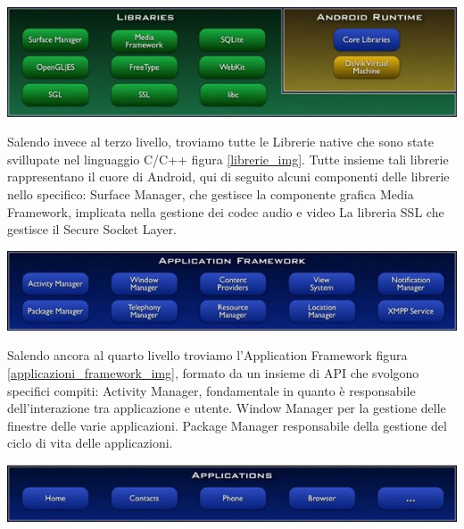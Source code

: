 \begin{center}
\includegraphics[width=1\textwidth]{imgs/Librerie.jpg}
\label{librerie_img}%
\end{center}

Salendo invece al terzo livello, troviamo tutte le Librerie native che sono state svillupate nel linguaggio C/C++ figura \ref{librerie_img}.
Tutte insieme tali librerie rappresentano il cuore di Android, qui di seguito alcuni componenti delle librerie nello specifico: Surface Manager, che gestisce la componente grafica
Media Framework, implicata nella gestione dei codec audio e video
La libreria SSL che gestisce il Secure Socket Layer.

\begin{center}
\includegraphics[width=1\textwidth]{imgs/Applicazioni_Framework.jpg}
\label{applicazioni_framework_img}%
\end{center}

Salendo ancora al quarto livello troviamo l'Application Framework figura \ref{applicazioni_framework_img}, formato da un insieme di API che svolgono specifici compiti:
Activity Manager, fondamentale in quanto è responsabile dell'interazione tra applicazione e utente.
Window Manager per la gestione delle finestre delle varie applicazioni.
Package Manager responsabile della gestione del ciclo di vita delle applicazioni.

\begin{center}
\includegraphics[width=1\textwidth]{imgs/Applicazioni.jpg}
\label{applicazioni_img}%
\end{center}

